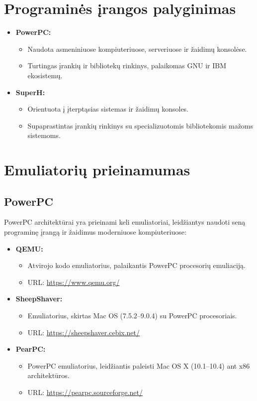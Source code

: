 \documentclass{article}
\begin{document}
\section*{Programinės įrangos palyginimas}
\begin{itemize}
    \item \textbf{PowerPC:}
        \begin{itemize}
            \item Naudota asmeniniuose kompiuteriuose, serveriuose ir žaidimų konsolėse.
            \item Turtingas įrankių ir bibliotekų rinkinys, palaikomas GNU ir IBM ekosistemų.
        \end{itemize}
    \item \textbf{SuperH:}
        \begin{itemize}
            \item Orientuota į įterptąsias sistemas ir žaidimų konsoles.
            \item Supaprastintas įrankių rinkinys su specializuotomis bibliotekomis mažoms sistemoms.
        \end{itemize}
\end{itemize}

\section{Emuliatorių prieinamumas}
\subsection{PowerPC}
PowerPC architektūrai yra prieinami keli emuliatoriai, leidžiantys naudoti seną programinę įrangą ir žaidimus moderniuose kompiuteriuose:

\begin{itemize}
    \item \textbf{QEMU:}
        \begin{itemize}
            \item Atvirojo kodo emuliatorius, palaikantis PowerPC procesorių emuliaciją.
            \item URL: \url{https://www.qemu.org/}
        \end{itemize}
    \item \textbf{SheepShaver:}
        \begin{itemize}
            \item Emuliatorius, skirtas Mac OS (7.5.2–9.0.4) su PowerPC procesoriais.
            \item URL: \url{https://sheepshaver.cebix.net/}
        \end{itemize}
    \item \textbf{PearPC:}
        \begin{itemize}
            \item PowerPC emuliatorius, leidžiantis paleisti Mac OS X (10.1–10.4) ant x86 architektūros.
            \item URL: \url{https://pearpc.sourceforge.net/}
        \end{itemize}
\end{itemize}
\end{document}
